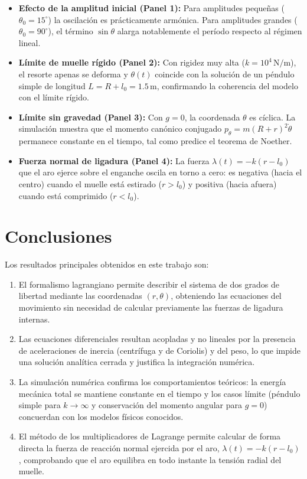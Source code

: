 \documentclass[11pt,a4paper]{article}
\begin{document}
\begin{itemize}\setlength{\itemsep}{0pt}\setlength{\parskip}{0pt}
    \item \textbf{Efecto de la amplitud inicial (Panel 1):} Para amplitudes pequeñas ($\theta_0 = 15^\circ$) la oscilación es prácticamente armónica. Para amplitudes grandes ($\theta_0 = 90^\circ$), el término $\sin\theta$ alarga notablemente el período respecto al régimen lineal.
    \item \textbf{Límite de muelle rígido (Panel 2):} Con rigidez muy alta ($k = 10^4\,\text{N/m}$), el resorte apenas se deforma y $\theta(t)$ coincide con la solución de un péndulo simple de longitud $L = R + l_0 = 1.5\,\text{m}$, confirmando la coherencia del modelo con el límite rígido.
    \item \textbf{Límite sin gravedad (Panel 3):} Con $g = 0$, la coordenada $\theta$ es cíclica. La simulación muestra que el momento canónico conjugado $p_\theta = m(R+r)^2\dot{\theta}$ permanece constante en el tiempo, tal como predice el teorema de Noether.
    \item \textbf{Fuerza normal de ligadura (Panel 4):} La fuerza $\lambda(t) = -k(r - l_0)$ que el aro ejerce sobre el enganche oscila en torno a cero: es negativa (hacia el centro) cuando el muelle está estirado ($r > l_0$) y positiva (hacia afuera) cuando está comprimido ($r < l_0$).
\end{itemize}

\section*{Conclusiones}
\vspace{-0.2em}
Los resultados principales obtenidos en este trabajo son:
\begin{enumerate}\setlength{\itemsep}{0pt}\setlength{\parskip}{0pt}
    \item El formalismo lagrangiano permite describir el sistema de dos grados de libertad mediante las coordenadas $(r, \theta)$, obteniendo las ecuaciones del movimiento sin necesidad de calcular previamente las fuerzas de ligadura internas.
    \item Las ecuaciones diferenciales resultan acopladas y no lineales por la presencia de aceleraciones de inercia (centrífuga y de Coriolis) y del peso, lo que impide una solución analítica cerrada y justifica la integración numérica.
    \item La simulación numérica confirma los comportamientos teóricos: la energía mecánica total se mantiene constante en el tiempo y los casos límite (péndulo simple para $k \to \infty$ y conservación del momento angular para $g = 0$) concuerdan con los modelos físicos conocidos.
    \item El método de los multiplicadores de Lagrange permite calcular de forma directa la fuerza de reacción normal ejercida por el aro, $\lambda(t) = -k(r - l_0)$, comprobando que el aro equilibra en todo instante la tensión radial del muelle.
\end{enumerate}
\end{document}
